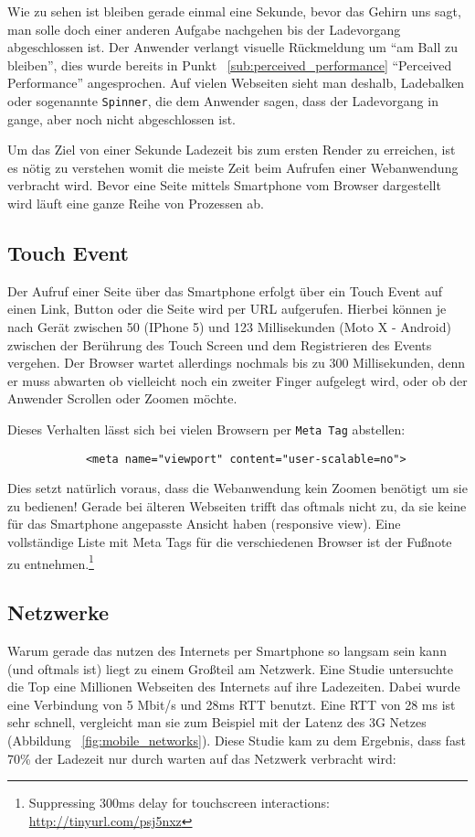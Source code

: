 	Wie zu sehen ist bleiben gerade einmal eine Sekunde, bevor das Gehirn uns sagt, man solle doch einer anderen Aufgabe nachgehen bis der Ladevorgang abgeschlossen ist. Der Anwender verlangt visuelle Rückmeldung um "`am Ball zu bleiben"', dies wurde bereits in Punkt ~\ref{sub:perceived_performance} "`Perceived Performance"' angesprochen. Auf vielen Webseiten sieht man deshalb, Ladebalken oder sogenannte \texttt{Spinner}, die dem Anwender sagen, dass der Ladevorgang in gange, aber noch nicht abgeschlossen ist.

	Um das Ziel von einer Sekunde Ladezeit bis zum ersten Render zu erreichen, ist es nötig zu verstehen womit die meiste Zeit beim Aufrufen einer Webanwendung verbracht wird. Bevor eine Seite mittels Smartphone vom Browser dargestellt wird läuft eine ganze Reihe von Prozessen ab.



	\subsection{Touch Event} %
	\label{sub:touch_event}
		Der Aufruf einer Seite über das Smartphone erfolgt über ein Touch Event auf einen Link, Button oder die Seite wird per URL aufgerufen. Hierbei können je nach Gerät zwischen 50 (IPhone 5) und 123 Millisekunden (Moto X - Android) zwischen der Berührung des Touch Screen und dem Registrieren des Events vergehen.\autocite{venturebeat} Der Browser wartet allerdings nochmals bis zu 300 Millisekunden, denn er muss abwarten ob vielleicht noch ein zweiter Finger aufgelegt wird, oder ob der Anwender Scrollen oder Zoomen möchte.\autocite{google11}

		Dieses Verhalten lässt sich bei vielen Browsern per \texttt{Meta Tag} abstellen:

		\begin{lstlisting}
			<meta name="viewport" content="user-scalable=no">
		\end{lstlisting}

		Dies setzt natürlich voraus, dass die Webanwendung kein Zoomen benötigt um sie zu bedienen! Gerade bei älteren Webseiten trifft das oftmals nicht zu, da sie keine für das Smartphone angepasste Ansicht haben (responsive view). Eine vollständige Liste mit Meta Tags für die verschiedenen Browser ist der Fußnote zu entnehmen.\footnote{Suppressing 300ms delay for touchscreen interactions: \url{http://tinyurl.com/psj5nxz}}


	\subsection{Netzwerke} %
	\label{sub:netzwerke}
		Warum gerade das nutzen des Internets per Smartphone so langsam sein kann (und oftmals ist) liegt zu einem Großteil am Netzwerk. Eine Studie untersuchte die Top eine Millionen Webseiten des Internets auf ihre Ladezeiten. Dabei wurde eine Verbindung von 5 Mbit/s und 28ms RTT benutzt. Eine RTT von 28 ms ist sehr schnell, vergleicht man sie zum Beispiel mit der Latenz des 3G Netzes (Abbildung ~\ref{fig:mobile_networks}). Diese Studie kam zu dem Ergebnis, dass fast 70\% der Ladezeit nur durch warten auf das Netzwerk verbracht wird:

